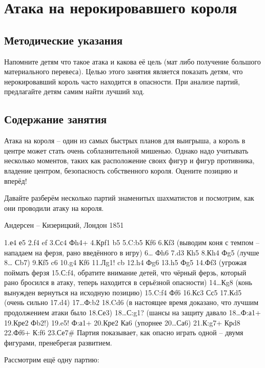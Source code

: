 \chapter{Атака на нерокировавшего короля}

\section{Методические указания}

Напомните детям что такое атака и какова её цель (мат либо получение большого материального перевеса). Целью этого занятия является показать детям, что нерокировавший король часто находится в опасности. При анализе партий, предлагайте детям самим найти лучший ход.

\section{Содержание занятия}

Атака на короля – один из самых быстрых планов для выигрыша, а король в центре может стать очень соблазнительной мишенью. Однако надо учитывать несколько моментов, таких как расположение своих фигур и фигур противника, владение центром, безопасность собственного короля. Оцените позицию и вперёд!

Давайте разберём несколько партий знаменитых шахматистов и посмотрим, как они проводили атаку на короля.

Андерсен – Кизерицкий, Лондон 1851

1.е4 е5 2.f4 ef 3.Сс4 Фh4+ 4.Крf1 b5 5.C:b5 Кf6 6.Кf3 (выводим коня с темпом – нападаем на ферзя, рано введённого в игру) 6… Фh6 7.d3 Кh5 8.Кh4 Фg5 (лучше 8… Сb7) 9.Кf5 c6 10.g4 Кf6 11.Лg1! cb 12.h4 Фg6 13.h5 Фg5 14.Фf3 (угрожая поймать ферзя 15.С:f4, обратите внимание детей, что чёрный ферзь, который рано бросился в атаку, теперь находится в серьёзной опасности) 14…Кg8 (конь вынужден вернуться на исходную позицию) 15.C:f4 Фf6 16.Кс3 Сс5 17.Кd5 (очень сильно 17.d4) 17…Ф:b2 18.Cd6 (в настоящее время доказано, что лучшим продолжением атаки было 18.Се3) 18…С:g1? (шансы на защиту давало 18…Ф:а1+ 19.Кре2 Фb2!) 19.e5! Ф:а1+ 20.Кре2 Ка6 (упорнее 20…Са6) 21.К:g7+ Крd8 22.Фf6+ К:f6 23.Се7\# Партия показывает, как опасно играть одной – двумя фигурами, пренебрегая развитием.

Рассмотрим ещё одну партию:

